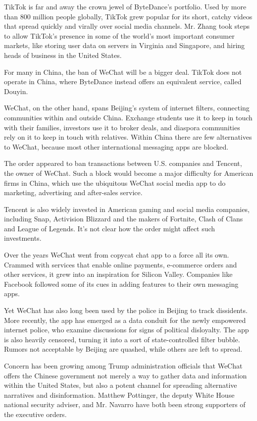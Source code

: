 TikTok is far and away the crown jewel of ByteDance's portfolio. Used by
more than 800 million people globally, TikTok grew popular for its
short, catchy videos that spread quickly and virally over social media
channels. Mr. Zhang took steps to allow TikTok's presence in some of the
world's most important consumer markets, like storing user data on
servers in Virginia and Singapore, and hiring heads of business in the
United States.

For many in China, the ban of WeChat will be a bigger deal. TikTok does
not operate in China, where ByteDance instead offers an equivalent
service, called Douyin.

WeChat, on the other hand, spans Beijing's system of internet filters,
connecting communities within and outside China. Exchange students use
it to keep in touch with their families, investors use it to broker
deals, and diaspora communities rely on it to keep in touch with
relatives. Within China there are few alternatives to WeChat, because
most other international messaging apps are blocked.

The order appeared to ban transactions between U.S. companies and
Tencent, the owner of WeChat. Such a block would become a major
difficulty for American firms in China, which use the ubiquitous WeChat
social media app to do marketing, advertising and after-sales service.

Tencent is also widely invested in American gaming and social media
companies, including Snap, Activision Blizzard and the makers of
Fortnite, Clash of Clans and League of Legends. It's not clear how the
order might affect such investments.

Over the years WeChat went from copycat chat app to a force all its own.
Crammed with services that enable online payments, e-commerce orders and
other services, it grew into an inspiration for Silicon Valley.
Companies like Facebook followed some of its cues in adding features to
their own messaging apps.

Yet WeChat has also long been used by the police in Beijing to track
dissidents. More recently, the app has emerged as a data conduit for the
newly empowered internet police, who examine discussions for signs of
political disloyalty. The app is also heavily censored, turning it into
a sort of state-controlled filter bubble. Rumors not acceptable by
Beijing are quashed, while others are left to spread.

Concern has been growing among Trump administration officials that
WeChat offers the Chinese government not merely a way to gather data and
information within the United States, but also a potent channel for
spreading alternative narratives and disinformation. Matthew Pottinger,
the deputy White House national security adviser, and Mr. Navarro have
both been strong supporters of the executive orders.

